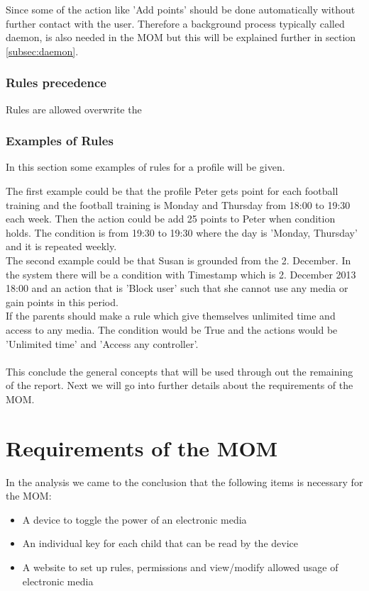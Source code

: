 Since some of the action like 'Add points' should be done automatically without further contact with the user. Therefore a background process typically called daemon, is also needed in the MOM but this will be explained further in section \ref{subsec:daemon}. 
	
\subsubsection{Rules precedence}
Rules are allowed overwrite the  


\subsubsection{Examples of Rules}
In this section some examples of rules for a profile will be given.

The first example could be that the profile Peter gets point for each football training and the football training is Monday and Thursday from 18:00 to 19:30 each week. Then the action could be add 25 points to Peter when condition holds. The condition is from 19:30 to 19:30 where the day is 'Monday, Thursday' and it is repeated weekly. \\

The second example could be that Susan is grounded from the 2. December. In the system there will be a condition with Timestamp which is 2. December 2013 18:00
and an action that is 'Block user' such that she cannot use any media or gain points in this period. \\

If the parents should make a rule which give themselves unlimited time and access to any media. The condition would be True and the actions would be 'Unlimited time' and 'Access any controller'.\\\\

This conclude the general concepts that will be used through out the remaining of the report. Next we will go into further details about the requirements of the MOM.  


\section{Requirements of the MOM}
\label{sec:RequirMOM}

In the analysis we came to the conclusion that the following items is necessary for the MOM: 
\begin{itemize}
	\item A device to toggle the power of an electronic media
	\item An individual key for each child that can be read by the device
	\item A website to set up rules, permissions and view/modify allowed usage of electronic media
\end{itemize} 


